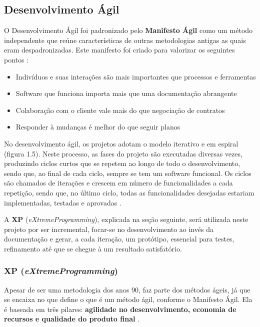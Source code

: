 \subsection{Desenvolvimento Ágil}\label{subsec:devagil}
O Desenvolvimento Ágil foi padronizado pelo \textbf{Manifesto Ágil} como um método independente que reúne características de outras metodologias antigas as quais eram despadronizadas. Este manifesto foi criado para valorizar os seguintes pontos \cite{dev-agil}:

\begin{itemize}
	\item Indivíduos e suas interações são mais importantes que processos e ferramentas
	\item Software que funciona importa mais que uma documentação abrangente
	\item Colaboração com o cliente vale mais do que negociação de contratos
	\item Responder à mudanças é melhor do que seguir planos
\end{itemize}

No desenvolvimento ágil, os projetos adotam o modelo iterativo e em espiral (figura 1.5). Neste processo, as fases do projeto são executadas diversas vezes, produzindo ciclos curtos que se repetem ao longo de todo o desenvolvimento, sendo que, ao final de cada ciclo, sempre se tem um software funcional. Os ciclos são chamados de iterações e crescem em número de funcionalidades a cada repetição, sendo que, no último ciclo, todas as funcionalidades desejadas estariam implementadas, testadas e aprovadas \cite{dev-agil2}.

A \textbf{XP} (\textit{eXtremeProgramming}), explicada na seção seguinte, será utilizada neste projeto por ser incremental, focar-se no desenvolvimento ao invés da documentação e gerar, a cada iteração, um protótipo, essencial para testes, refinamento até que se chegue à um resultado satisfatório.

\subsubsection{XP (\textit{eXtremeProgramming})}

Apesar de ser uma metodologia dos anos 90, faz parte dos métodos ágeis, já que se encaixa no que define o que é um método ágil, conforme o Manifesto Ágil. Ela é baseada em três pilares: \textbf{agilidade no desenvolvimento, economia de recursos e qualidade do produto final} \cite{dev-agil2}.

